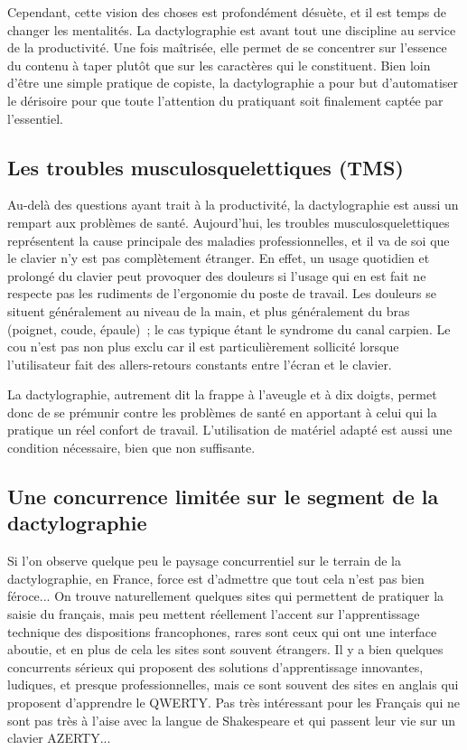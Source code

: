 \documentclass[a4paper,12pt]{article}
\begin{document}
Cependant, cette vision des choses est profondément désuète, et il est temps de changer les mentalités. La dactylographie est avant tout une discipline au service de la productivité. Une fois maîtrisée, elle permet de se concentrer sur l'essence du contenu à taper plutôt que sur les caractères qui le constituent. Bien loin d'être une simple pratique de copiste, la dactylographie a pour but d'automatiser le dérisoire pour que toute l'attention du pratiquant soit finalement captée par l'essentiel.

\subsection{Les troubles musculosquelettiques (TMS)}

Au-delà des questions ayant trait à la productivité, la dactylographie est aussi un rempart aux problèmes de santé. Aujourd'hui, les troubles musculosquelettiques représentent la cause principale des maladies professionnelles, et il va de soi que le clavier n'y est pas complètement étranger. En effet, un usage quotidien et prolongé du clavier peut provoquer des douleurs si l'usage qui en est fait ne respecte pas les rudiments de l'ergonomie du poste de travail. Les douleurs se situent généralement au niveau de la main, et plus généralement du bras (poignet, coude, épaule)~; le cas typique étant le syndrome du canal carpien. Le cou n'est pas non plus exclu car il est particulièrement sollicité lorsque l'utilisateur fait des allers-retours constants entre l'écran et le clavier.

La dactylographie, autrement dit la frappe à l'aveugle et à dix doigts, permet donc de se prémunir contre les problèmes de santé en apportant à celui qui la pratique un réel confort de travail. L'utilisation de matériel adapté est aussi une condition nécessaire, bien que non suffisante.

\subsection{Une concurrence limitée sur le segment de la dactylographie}

Si l'on observe quelque peu le paysage concurrentiel sur le terrain de la dactylographie, en France, force est d'admettre que tout cela n'est pas bien féroce... On trouve naturellement quelques sites qui permettent de pratiquer la saisie du français, mais peu mettent réellement l'accent sur l'apprentissage technique des dispositions francophones, rares sont ceux qui ont une interface aboutie, et en plus de cela les sites sont souvent étrangers.
Il y a bien quelques concurrents sérieux qui proposent des solutions d'apprentissage innovantes, ludiques, et presque professionnelles, mais ce sont souvent des sites en anglais qui proposent d'apprendre le QWERTY. Pas très intéressant pour les Français qui ne sont pas très à l'aise avec la langue de Shakespeare et qui passent leur vie sur un clavier AZERTY...
\end{document}
